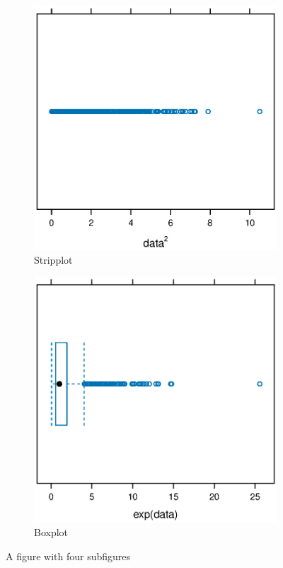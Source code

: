 \documentclass[10pt, a4paper, titlepage]{article}
\begin{document}
\begin{figure}[hbt!]
\begin{subfigure}{.4\linewidth}
  \includegraphics[width=\linewidth]{plot3.eps}
  \caption{Stripplot}
  \label{plot3}
\end{subfigure}\hfill %
\begin{subfigure}{.4\linewidth}
  \includegraphics[width=\linewidth]{plot4.eps}
  \caption{Boxplot}
  \label{plot4}
\end{subfigure}

\caption{A figure with four subfigures}
\end{figure}
\end{document}
